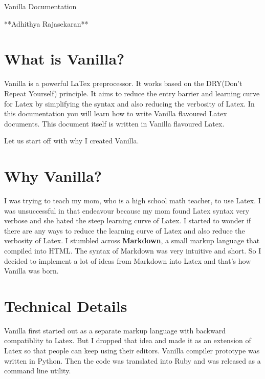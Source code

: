 \documentclass{article}
\begin{document}
\begin{center}

\huge{Vanilla Documentation}\vspace{5pt}

\large{**Adhithya Rajasekaran**}

\end{center}

\vspace{30pt}

\section*{What is Vanilla?}

Vanilla is a powerful LaTex preprocessor. It works based on the DRY(Don't Repeat Yourself) principle. It aims to reduce the entry barrier and learning curve for Latex by simplifying the syntax and also reducing the verbosity of Latex. In this documentation you will learn how to write Vanilla flavoured Latex documents. This document itself is written in Vanilla flavoured Latex. \vspace{5pt}

Let us start off with why I created Vanilla. \vspace{5pt}

\section*{Why Vanilla?}

I was trying to teach my mom, who is a high school math teacher, to use Latex. I was unsuccessful in that endeavour because my mom found Latex syntax very verbose and she hated the steep learning curve of Latex. I started to wonder if there are any ways to reduce the learning curve of Latex and also reduce the verbosity of Latex. I stumbled across \textbf{Markdown}, a small markup language that compiled into HTML. The syntax of Markdown was very intuitive and short. So I decided to implement a lot of ideas from Markdown into Latex and that's how Vanilla was born. 

\section*{Technical Details}

Vanilla first started out as a separate markup language with backward compatiblity to Latex. But I dropped that idea and made it as an extension of Latex so that people can keep using their editors. Vanilla compiler prototype was written in Python. Then the code was translated into Ruby and was released as a command line utility.
\end{document}
